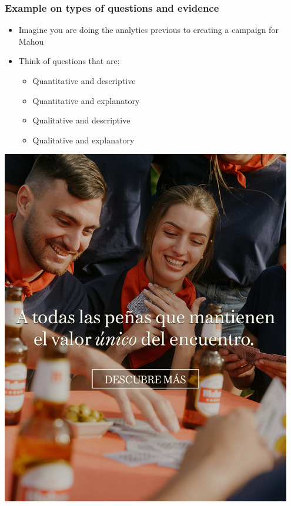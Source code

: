 \documentclass[aspectratio=43]{beamer}
\begin{document}
\begin{frame}
\frametitle{Example on types of questions and evidence}
\centering

\begin{minipage}{.49\textwidth}\centering
  \begin{itemize}
    \item Imagine you are doing the analytics previous to creating a campaign for Mahou
    \item Think of questions that are:
    \begin{itemize}
      \item Quantitative and descriptive
      \item Quantitative and explanatory
      \item Qualitative and descriptive
      \item Qualitative and explanatory
    \end{itemize}
  \end{itemize}
\end{minipage}\hfill
\begin{minipage}{.49\textwidth}\centering
\includegraphics[width = 0.95\textwidth]{../img/mahou}
\end{minipage}

\end{frame}
\end{document}
